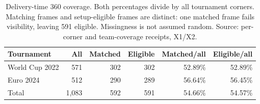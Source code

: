 \begin{table}[tbp]
\caption{Delivery-time 360 coverage. Both percentages divide by all tournament corners. Matching frames and setup-eligible frames are distinct: one matched frame fails visibility, leaving 591 eligible. Missingness is not assumed random. Source: per-corner and team-coverage receipts, X1/X2.}
\label{tab:spatial-coverage}
\centering
\normalsize
\setlength{\tabcolsep}{3.5pt}
\begin{tabular}{@{}lrrrrr@{}}
\toprule
Tournament & All & Matched & Eligible & Matched/all & Eligible/all \\
\midrule
World Cup 2022 & 571 & 302 & 302 & 52.89\% & 52.89\% \\
Euro 2024 & 512 & 290 & 289 & 56.64\% & 56.45\% \\
Total & 1,083 & 592 & 591 & 54.66\% & 54.57\% \\
\bottomrule
\end{tabular}
\end{table}
